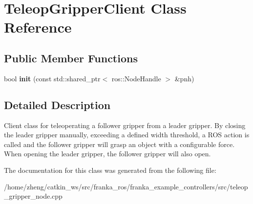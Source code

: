 \hypertarget{class_teleop_gripper_client}{}\section{Teleop\+Gripper\+Client Class Reference}
\label{class_teleop_gripper_client}
\subsection*{Public Member Functions}
\begin{DoxyCompactItemize}
\item 
\mbox{\label{class_teleop_gripper_client_a2aad10e96b7eacb842722a6dbe8f10cf}} 
bool {\bfseries init} (const std\+::shared\+\_\+ptr$<$ ros\+::\+Node\+Handle $>$ \&pnh)
\end{DoxyCompactItemize}


\subsection{Detailed Description}
Client class for teleoperating a follower gripper from a leader gripper. By closing the leader gripper manually, exceeding a defined width threshold, a R\+OS action is called and the follower gripper will grasp an object with a configurable force. When opening the leader gripper, the follower gripper will also open. 

The documentation for this class was generated from the following file\+:\begin{DoxyCompactItemize}
\item 
/home/zheng/catkin\+\_\+ws/src/franka\+\_\+ros/franka\+\_\+example\+\_\+controllers/src/teleop\+\_\+gripper\+\_\+node.\+cpp\end{DoxyCompactItemize}
